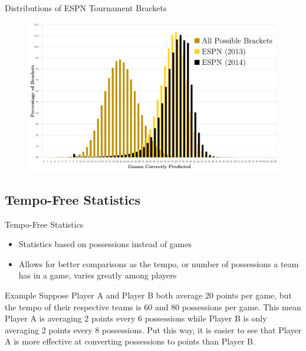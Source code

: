 \documentclass{beamer}
\begin{document}
\begin{frame}{Distributions of ESPN Tournament Brackets}
 \begin{figure}[!t]
 \centering
 \includegraphics[width=4.75in]{distro2.png} 
  \label{distro}
 \end{figure}
\end{frame}




\subsection{Tempo-Free Statistics}

\begin{frame}{Tempo-Free Statistics}

\begin{itemize}
\item Statistics based on possessions instead of games
\item Allows for better comparisons as the tempo, or number of possessions a team has in a game, varies greatly among players
\end{itemize}
\begin{block}{Example}
Suppose Player A and Player B both average 20 points per game, but the tempo of their respective teams is 60 and 80 possessions per game. This mean Player A is averaging 2 points every 6 possessions while Player B is only averaging 2 points every 8 possessions. Put this way, it is easier to see that Player A is more effective at converting possessions to points than Player B.
\end{block} 
\end{frame}
\end{document}
